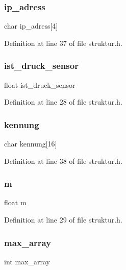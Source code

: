 \mbox{\label{structramp1_aa7498500dcde1fcdd3e54681fae52dd4}} 
\subsubsection{ip\+\_\+adress}
{\footnotesize\ttfamily char ip\+\_\+adress[4]}



Definition at line 37 of file struktur.\+h.

\mbox{\label{structramp1_a81a9d0bd8eeb10432da631750ec47f21}} 
\subsubsection{ist\+\_\+druck\+\_\+sensor}
{\footnotesize\ttfamily float ist\+\_\+druck\+\_\+sensor}



Definition at line 28 of file struktur.\+h.

\mbox{\label{structramp1_ac7064f5dfb13f42d4e573ae60ddc4aa3}} 
\subsubsection{kennung}
{\footnotesize\ttfamily char kennung[16]}



Definition at line 38 of file struktur.\+h.

\mbox{\label{structramp1_ac51334f57ef8b81c0629c9421798c344}} 
\subsubsection{m}
{\footnotesize\ttfamily float m}



Definition at line 29 of file struktur.\+h.

\mbox{\label{structramp1_a1401621f217100f5db6fc3cad21c8144}} 
\subsubsection{max\+\_\+array}
{\footnotesize\ttfamily int max\+\_\+array}



